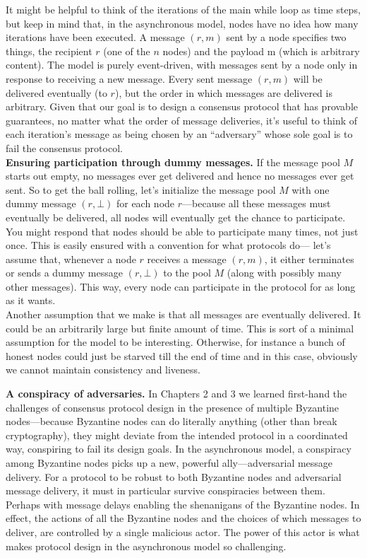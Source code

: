 It might be helpful to think of the iterations of the main while loop as time steps, but keep
in mind that, in the asynchronous model, nodes have no idea how many iterations have
been executed. A message $(r, m)$ sent by a node specifies two things, the recipient $r$ (one of
the $n$ nodes) and the payload m (which is arbitrary content). The model is purely event-driven, with messages sent by a node only in response to receiving a new message. Every sent message $(r, m)$ will be delivered eventually (to $r$), but the order in which messages
are delivered is arbitrary. Given that our goal is to design a consensus protocol that has
provable guarantees, no matter what the order of message deliveries, it’s useful to think of
each iteration’s message as being chosen by an “adversary” whose sole goal is to fail the
consensus protocol.\\

\noindent
\textbf{Ensuring participation through dummy messages.} If the message pool $M$ starts out
empty, no messages ever get delivered and hence no messages ever get sent. So to get the
ball rolling, let’s initialize the message pool $M$ with one dummy message $(r, \bot)$ for each
node $r$—because all these messages must eventually be delivered, all nodes will eventually
get the chance to participate. You might respond that nodes should be able to participate
many times, not just once. This is easily ensured with a convention for what protocols do—
let’s assume that, whenever a node $r$ receives a message $(r, m)$, it either terminates or sends
a dummy message $(r, \bot)$ to the pool $M$ (along with possibly many other messages). This
way, every node can participate in the protocol for as long as it wants.\\
Another assumption that we make is that all messages are eventually delivered. It could be an arbitrarily large but finite amount of time. This is sort of a minimal assumption for the model to be interesting. Otherwise, for instance a bunch of honest nodes could just be starved till the end of time and in this case, obviously we cannot maintain consistency and liveness.

\noindent
\textbf{A conspiracy of adversaries.} In Chapters 2 and 3 we learned first-hand the challenges of
consensus protocol design in the presence of multiple Byzantine nodes—because Byzantine
nodes can do literally anything (other than break cryptography), they might deviate
from the intended protocol in a coordinated way, conspiring to fail its design goals.
In the asynchronous model, a conspiracy among Byzantine nodes picks up a new, powerful
ally—adversarial message delivery. For a protocol to be robust to both Byzantine nodes
and adversarial message delivery, it must in particular survive conspiracies between them.
 Perhaps with message delays enabling the shenanigans of the Byzantine nodes. In effect, the
actions of all the Byzantine nodes and the choices of which messages to deliver, are controlled
by a single malicious actor. The power of this actor is what makes protocol design in the
asynchronous model so challenging.\\

